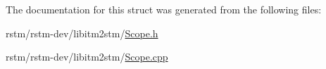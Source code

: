 The documentation for this struct was generated from the following files\-:\begin{DoxyCompactItemize}
\item 
rstm/rstm-\/dev/libitm2stm/\hyperlink{Scope_8h}{Scope.\-h}\item 
rstm/rstm-\/dev/libitm2stm/\hyperlink{Scope_8cpp}{Scope.\-cpp}\end{DoxyCompactItemize}
